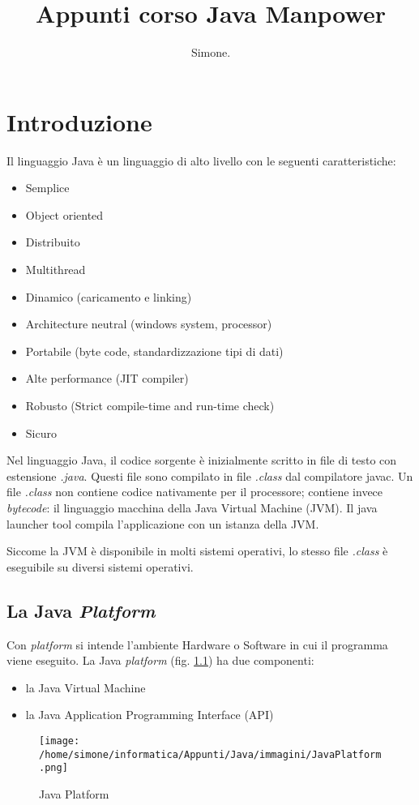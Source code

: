 \documentclass[a4paper,12pt,twoside]{book}
\author{Simone.}
\title{Appunti corso Java Manpower}
\begin{document}
\maketitle

\newpage

\tableofcontents

\newpage
\chapter{Introduzione}
Il linguaggio Java è un linguaggio di alto livello con le seguenti
caratteristiche:
\begin{itemize}
\item Semplice
\item Object oriented
\item Distribuito
\item Multithread
\item Dinamico (caricamento e linking)
\item Architecture neutral (windows system, processor)
\item Portabile (byte code, standardizzazione tipi di dati)
\item Alte performance (JIT compiler)
\item Robusto (Strict compile-time and run-time check)
\item Sicuro
\end{itemize}
Nel linguaggio Java, il codice sorgente è inizialmente scritto in file
di testo con estensione \emph{.java}. Questi file sono compilato in
file \emph{.class} dal compilatore javac. Un file \emph{.class} non
contiene codice nativamente per il processore; contiene invece
\emph{bytecode}: il linguaggio macchina della Java Virtual Machine
(JVM). Il java launcher tool compila l'applicazione con un istanza
della JVM.

Siccome la JVM è disponibile in molti sistemi operativi, lo stesso
file \emph{.class} è eseguibile su diversi sistemi operativi.

\section{La Java \emph{Platform}}
Con \emph{platform} si intende l'ambiente Hardware o Software in cui
il programma viene eseguito. La Java \emph{platform}
(fig. \ref{fig:JP}) ha due componenti:
\begin{itemize}
\item la Java Virtual Machine
\item la Java Application Programming Interface (API)
\end{itemize}
\begin{figure}
  \centering
  \texttt{[image: /home/simone/informatica/Appunti/Java/immagini/JavaPlatform.png]}
  \caption{Java Platform \label{fig:JP}}
\end{figure}
\end{document}
